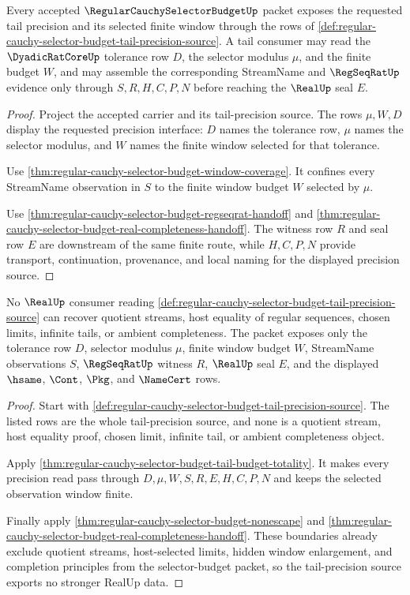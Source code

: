 \begin{theorem}
\label{thm:regular-cauchy-selector-budget-tail-budget-totality}
Every accepted $\RegularCauchySelectorBudgetUp$ packet exposes the requested tail precision and its selected finite window through the rows of \autoref{def:regular-cauchy-selector-budget-tail-precision-source}. A tail consumer may read the $\DyadicRatCoreUp$ tolerance row $D$, the selector modulus $\mu$, and the finite budget $W$, and may assemble the corresponding StreamName and $\RegSeqRatUp$ evidence only through $S,R,H,C,P,N$ before reaching the $\RealUp$ seal $E$.
\end{theorem}
\begin{proof}
Project the accepted carrier and its tail-precision source. The rows $\mu,W,D$ display the requested precision interface: $D$ names the tolerance row, $\mu$ names the selector modulus, and $W$ names the finite window selected for that tolerance.

Use \autoref{thm:regular-cauchy-selector-budget-window-coverage}. It confines every StreamName observation in $S$ to the finite window budget $W$ selected by $\mu$.

Use \autoref{thm:regular-cauchy-selector-budget-regseqrat-handoff} and \autoref{thm:regular-cauchy-selector-budget-real-completeness-handoff}. The witness row $R$ and seal row $E$ are downstream of the same finite route, while $H,C,P,N$ provide transport, continuation, provenance, and local naming for the displayed precision source.
\end{proof}

\begin{theorem}
\label{thm:regular-cauchy-selector-budget-precision-window-nonescape}
No $\RealUp$ consumer reading \autoref{def:regular-cauchy-selector-budget-tail-precision-source} can recover quotient streams, host equality of regular sequences, chosen limits, infinite tails, or ambient completeness. The packet exposes only the tolerance row $D$, selector modulus $\mu$, finite window budget $W$, StreamName observations $S$, $\RegSeqRatUp$ witness $R$, $\RealUp$ seal $E$, and the displayed $\hsame$, $\Cont$, $\Pkg$, and $\NameCert$ rows.
\end{theorem}
\begin{proof}
Start with \autoref{def:regular-cauchy-selector-budget-tail-precision-source}. The listed rows are the whole tail-precision source, and none is a quotient stream, host equality proof, chosen limit, infinite tail, or ambient completeness object.

Apply \autoref{thm:regular-cauchy-selector-budget-tail-budget-totality}. It makes every precision read pass through $D,\mu,W,S,R,E,H,C,P,N$ and keeps the selected observation window finite.

Finally apply \autoref{thm:regular-cauchy-selector-budget-nonescape} and \autoref{thm:regular-cauchy-selector-budget-real-completeness-handoff}. These boundaries already exclude quotient streams, host-selected limits, hidden window enlargement, and completion principles from the selector-budget packet, so the tail-precision source exports no stronger RealUp data.
\end{proof}

